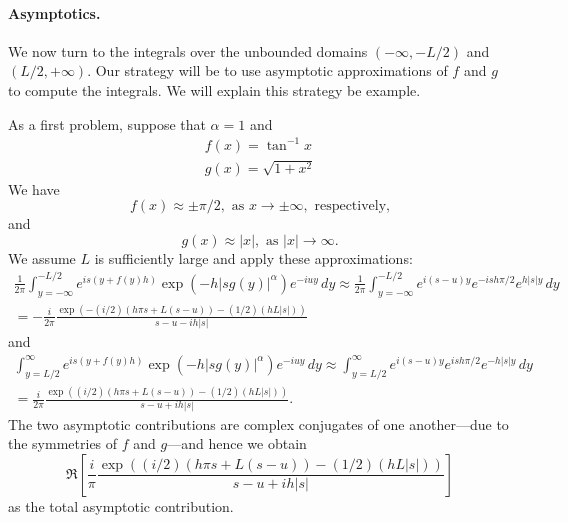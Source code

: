 \documentclass[11pt,letterpaper]{article}
\begin{document}
\paragraph{Asymptotics.} We now turn to the integrals over the unbounded domains $(-\infty, -L/2)$ and $(L/2, +\infty)$. Our strategy will be to use asymptotic approximations of $f$ and $g$ to compute the integrals. We will explain this strategy be example.

As a first problem, suppose that $\alpha = 1$ and
\begin{gather*}
f(x) = \tan^{-1} x \\
g(x) = \sqrt{1 + x^2}
\end{gather*}
We have
\[
f(x) \approx \pm \pi/2, \text{ as } x \to \pm \infty, \text{ respectively,}
\]
and
\[
g(x) \approx |x|, \text{ as } |x| \to \infty.
\]
We assume $L$ is sufficiently large and apply these approximations:
\begin{multline*}
\frac{1}{2 \pi} \int_{y=-\infty}^{-L/2} e^{is\left(y+f(y)h\right)}\exp{\left(  -h |s g(y)|^{\alpha} \right)}e^{-iuy}\, dy \approx \frac{1}{2 \pi} \int_{y=-\infty}^{-L/2} e^{i(s-u)y} e^{-i s h \pi/2} e^{h |s| y} \, dy \\
 = - \frac{i}{2 \pi} \frac{\exp \left( - (i/2)(h \pi s + L(s-u)) - (1/2)(h L |s|) \right)}{s - u - i h |s|}
\end{multline*}
and
\begin{multline*}
\int_{y=L/2}^{\infty} e^{is\left(y+f(y)h\right)}\exp{\left(  -h |s g(y)|^{\alpha} \right)}e^{-iuy}\, dy \approx \int_{y=L/2}^{\infty} e^{i(s-u)y} e^{i s h \pi/2} e^{-h |s| y} \, dy \\
 = \frac{i}{2 \pi} \frac{\exp \left( (i/2)(h \pi s + L(s-u)) - (1/2)(h L |s|) \right)}{s - u + i h |s|}.
\end{multline*}
The two asymptotic contributions are complex conjugates of one another---due to the symmetries of $f$ and $g$---and hence we obtain
\begin{equation}
\label{eqn:asympcalc}
\Re \left[ \frac{i}{\pi} \frac{\exp \left( (i/2)(h \pi s + L(s-u)) - (1/2)(h L |s|) \right)}{s - u + i h |s|} \right]
\end{equation}
as the total asymptotic contribution.
\end{document}
